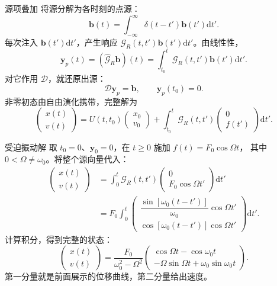 \documentclass[aspectratio=169,11pt]{beamer}
\newcommand{\dd}{\mathrm d}
\begin{document}
\begin{frame}{源项叠加}
将源分解为各时刻的点源：
\[
\bm b(t)=\int_{-\infty}^{\infty}\delta(t-t')\bm b(t')\dd t'.
\]
每次注入 $\bm b(t')\dd t'$，产生响应
$\mathcal G_R(t,t')\bm b(t')\dd t'$。由线性性，
\[
\bm y_p(t)=(\widehat{\mathcal G}_R\bm b)(t)
=\int_{t_0}^{t}\mathcal G_R(t,t')\bm b(t')\dd t'.
\]
对它作用 $\mathcal D$，就还原出源：
\[
\mathcal D\bm y_p=\bm b,\qquad \bm y_p(t_0)=0.
\]
非零初态由自由演化携带，完整解为
\[
\boxed{\begin{pmatrix}x(t)\\v(t)\end{pmatrix}
=U(t,t_0)\begin{pmatrix}x_0\\v_0\end{pmatrix}
+\int_{t_0}^{t}\mathcal G_R(t,t')
\begin{pmatrix}0\\f(t')\end{pmatrix}\dd t'}.
\]
\end{frame}

\begin{frame}{受迫振动解}
取 $t_0=0$、$\bm y_0=0$，在 $t\ge0$ 施加 $f(t)=F_0\cos\Omega t$，
其中 $0<\Omega\ne\omega_0$。将整个源向量代入：
\[
\begin{aligned}
\begin{pmatrix}x(t)\\v(t)\end{pmatrix}
&=\int_0^t\mathcal G_R(t,t')
\begin{pmatrix}0\\F_0\cos\Omega t'\end{pmatrix}\dd t'\\[0.4em]
&=F_0\int_0^t\begin{pmatrix}
\dfrac{\sin[\omega_0(t-t')]}{\omega_0}\cos\Omega t'\\[0.5em]
\cos[\omega_0(t-t')]\cos\Omega t'
\end{pmatrix}\dd t'.
\end{aligned}
\]
计算积分，得到完整的状态：
\[
\boxed{\begin{pmatrix}x(t)\\v(t)\end{pmatrix}
=\frac{F_0}{\omega_0^2-\Omega^2}
\begin{pmatrix}
\cos\Omega t-\cos\omega_0t\\
-\Omega\sin\Omega t+\omega_0\sin\omega_0t
\end{pmatrix}}.
\]
第一分量就是前面展示的位移曲线，第二分量给出速度。
\end{frame}
\end{document}
